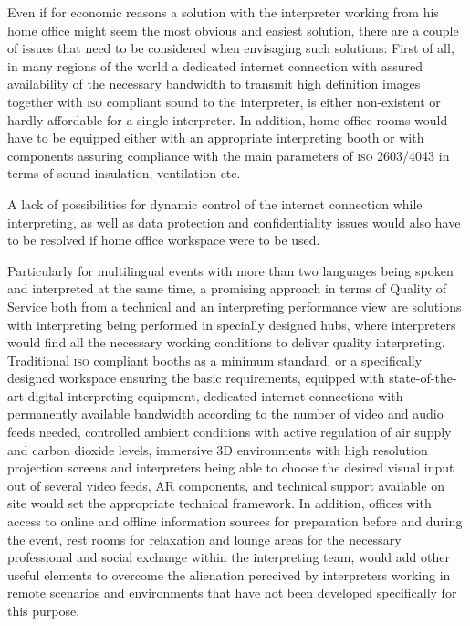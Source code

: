 \documentclass[output=paper]{langsci/langscibook}
\begin{document}
Even if for economic reasons a solution with the interpreter working from his home office might seem the most obvious and easiest solution, there are a couple of issues that need to be considered when envisaging such solutions: First of all, in many regions of the world a dedicated internet connection with assured availability of the necessary bandwidth to transmit high definition images together with \textsc{iso} compliant sound to the interpreter, is either non-existent or hardly affordable for a single interpreter. In addition, home office rooms would have to be equipped either with an appropriate interpreting booth or with components assuring compliance with the main parameters of \textsc{iso} 2603/4043 in terms of sound insulation, ventilation etc.

A lack of possibilities for dynamic control of the internet connection while interpreting, as well as data protection and confidentiality issues would also have to be resolved if home office workspace were to be used.

Particularly for multilingual events with more than two languages being spoken and interpreted at the same time, a promising approach in terms of Quality of Service both from a technical and an interpreting performance view are solutions with interpreting being performed in specially designed hubs, where interpreters would find all the necessary working conditions to deliver quality interpreting. Traditional \textsc{iso} compliant booths as a minimum standard, or a specifically designed workspace ensuring the basic requirements, equipped with state-of-the-art digital interpreting equipment, dedicated internet connections with permanently available bandwidth according to the number of video and audio feeds needed, controlled ambient conditions with active regulation of air supply and carbon dioxide levels, immersive 3D environments with high resolution projection screens and interpreters being able to choose the desired visual input out of several video feeds, \textsc{AR} components, and technical support available on site would set the appropriate technical framework. In addition, offices with access to online and offline information sources for preparation before and during the event, rest rooms for relaxation and lounge areas for the necessary professional and social exchange within the interpreting team, would add other useful elements to overcome the alienation perceived by interpreters working in remote scenarios and environments that have not been developed specifically for this purpose. 
\end{document}

